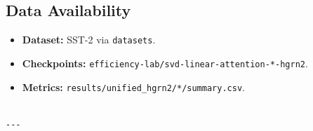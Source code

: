 \subsection{Data Availability}

\begin{itemize}
\item \textbf{Dataset:} SST-2 via \texttt{datasets}.
\item \textbf{Checkpoints:} \texttt{efficiency-lab/svd-linear-attention-*-hgrn2}.
\item \textbf{Metrics:} \texttt{results/unified\_hgrn2/*/summary.csv}.
\end{itemize}
\begin{lstlisting}

---
\end{lstlisting}